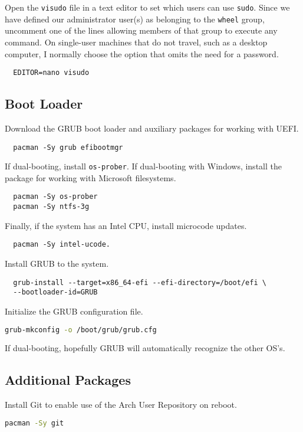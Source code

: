 \documentclass[letterpaper,12pt]{article}
\newcommand{\p}{\par\bigskip}
\begin{document}
Open the {\tt visudo} file in a text editor to set which users can use {\tt sudo}. Since we have defined our administrator user(s) as belonging to the {\tt wheel} group, uncomment one of the lines allowing members of that group to execute any command. On single-user machines that do not travel, such as a desktop computer, I normally choose the option that omits the need for a password.
\begin{lstlisting}
  EDITOR=nano visudo
\end{lstlisting}


\subsection{Boot Loader}
Download the GRUB boot loader and auxiliary packages for working with UEFI.
\begin{lstlisting}
  pacman -Sy grub efibootmgr
\end{lstlisting} \p

If dual-booting, install {\tt os-prober}. If dual-booting with Windows, install the package for working with Microsoft filesystems.
\begin{lstlisting}
  pacman -Sy os-prober
  pacman -Sy ntfs-3g
\end{lstlisting} \p

Finally, if the system has an Intel CPU, install microcode updates.
\begin{lstlisting}
  pacman -Sy intel-ucode.
\end{lstlisting} \p

Install GRUB to the system.
\begin{lstlisting}
  grub-install --target=x86_64-efi --efi-directory=/boot/efi \
  --bootloader-id=GRUB
\end{lstlisting} \p

Initialize the GRUB configuration file.
\begin{lstlisting}[language=bash]
  grub-mkconfig -o /boot/grub/grub.cfg
\end{lstlisting} \p

If dual-booting, hopefully GRUB will automatically recognize the other OS's.

\subsection{Additional Packages}
Install Git to enable use of the Arch User Repository on reboot.
\begin{lstlisting}[language=bash]
  pacman -Sy git
\end{lstlisting} \p
\end{document}
